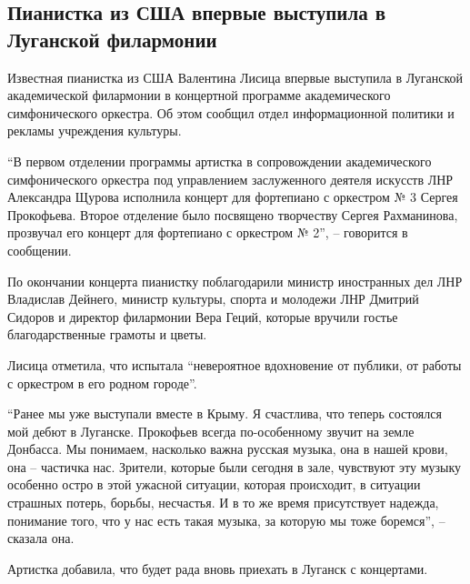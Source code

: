  
 
 
 
 
\subsection{Пианистка из США впервые выступила в Луганской филармонии}
\label{sec:20_12_2021.stz.news.lnr.lug_info.1.pianistka_lisica}


Известная пианистка из США Валентина Лисица впервые выступила в Луганской
академической филармонии в концертной программе академического симфонического
оркестра. Об этом сообщил отдел информационной политики и рекламы учреждения
культуры.


\enquote{В первом отделении программы артистка в сопровождении академического
симфонического оркестра под управлением заслуженного деятеля искусств ЛНР
Александра Щурова исполнила концерт для фортепиано с оркестром № 3 Сергея
Прокофьева. Второе отделение было посвящено творчеству Сергея Рахманинова,
прозвучал его концерт для фортепиано с оркестром № 2}, – говорится в сообщении.


По окончании концерта пианистку поблагодарили министр иностранных дел ЛНР
Владислав Дейнего, министр культуры, спорта и молодежи ЛНР Дмитрий Сидоров и
директор филармонии Вера Геций, которые вручили гостье благодарственные грамоты
и цветы.

Лисица отметила, что испытала \enquote{невероятное вдохновение от публики, от работы с
оркестром в его родном городе}.

\enquote{Ранее мы уже выступали вместе в Крыму. Я счастлива, что теперь состоялся мой
дебют в Луганске. Прокофьев всегда по-особенному звучит на земле Донбасса. Мы
понимаем, насколько важна русская музыка, она в нашей крови, она – частичка
нас. Зрители, которые были сегодня в зале, чувствуют эту музыку особенно остро
в этой ужасной ситуации, которая происходит, в ситуации страшных потерь,
борьбы, несчастья. И в то же время присутствует надежда, понимание того, что у
нас есть такая музыка, за которую мы тоже боремся}, – сказала она.

Артистка добавила, что будет рада вновь приехать в Луганск с концертами.
